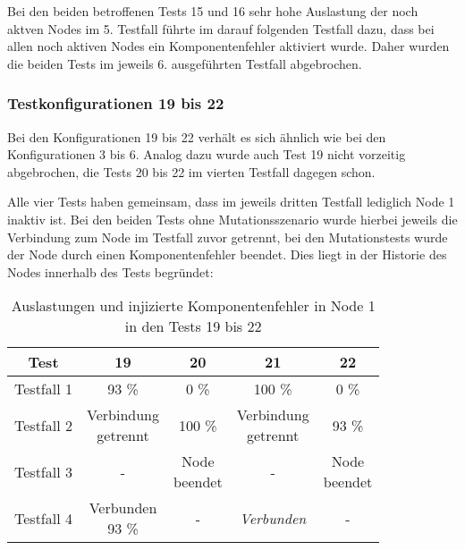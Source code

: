 Bei den beiden betroffenen Tests 15 und 16 sehr hohe Auslastung der noch aktven Nodes im 5. Testfall führte im darauf folgenden Testfall dazu, dass bei allen noch aktiven Nodes ein Komponentenfehler aktiviert wurde.
Daher wurden die beiden Tests im jeweils 6. ausgeführten Testfall abgebrochen.

\subsubsection{Testkonfigurationen 19 bis 22}
\label{sec:noReconf1922}

Bei den Konfigurationen 19 bis 22 verhält es sich ähnlich wie bei den Konfigurationen 3 bis 6.
Analog dazu wurde auch Test 19 nicht vorzeitig abgebrochen, die Tests 20 bis 22 im vierten Testfall dagegen schon.

Alle vier Tests haben gemeinsam, dass im jeweils dritten Testfall lediglich Node 1 inaktiv ist.
Bei den beiden Tests ohne Mutationsszenario wurde hierbei jeweils die Verbindung zum Node im Testfall zuvor getrennt, bei den Mutationstests wurde der Node durch einen Komponentenfehler beendet.
Dies liegt in der Historie des Nodes innerhalb des Tests begründet:

\begin{table}[h]
    \begin{tabular}{c|cccc}
    	   Test    &                19                 &             20             &                21                 &             22             \\ \hline
    	Testfall 1 &               93 \%               &            0 \%            &              100 \%               &            0 \%            \\
    	Testfall 2 & \makecell{Verbindung \\ getrennt} &          100  \%           & \makecell{Verbindung \\ getrennt} &           93  \%           \\
    	Testfall 3 &                 -                 & \makecell{Node \\ beendet} &                 -                 & \makecell{Node \\ beendet} \\
    	Testfall 4 &   \makecell{Verbunden \\ 93 \%}   &             -              &         \emph{Verbunden}          &             -
    \end{tabular} 
    \caption{Auslastungen und injizierte Komponentenfehler in Node 1 in den Tests 19 bis 22}
    \label{tab:loadNode1Tests1922}
\end{table}

